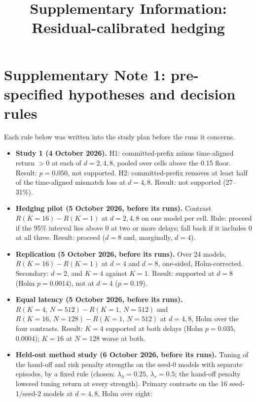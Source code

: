 \documentclass[pdflatex,sn-nature]{sn-jnl}
\begin{document}
\title{Supplementary Information: Residual-calibrated hedging}
\author{ }
\maketitle

\section*{Supplementary Note 1: pre-specified hypotheses and decision rules}
Each rule below was written into the study plan before the runs it concerns.
\begin{itemize}
\item \textbf{Study 1 (4 October 2026).} H1: committed-prefix minus time-aligned return $>0$ at each of $d=2,4,8$, pooled over cells above the 0.15 floor. Result: $p=0.050$, not supported. H2: committed-prefix removes at least half of the time-aligned mismatch loss at $d=4,8$. Result: not supported (27--31\%).
\item \textbf{Hedging pilot (5 October 2026, before its runs).} Contrast $R(K=16)-R(K=1)$ at $d=2,4,8$ on one model per cell. Rule: proceed if the 95\% interval lies above 0 at two or more delays; fall back if it includes 0 at all three. Result: proceed ($d=8$ and, marginally, $d=4$).
\item \textbf{Replication (5 October 2026, before its runs).} Over 24 models, $R(K=16)-R(K=1)$ at $d=4$ and $d=8$, one-sided, Holm-corrected. Secondary: $d=2$, and $K=4$ against $K=1$. Result: supported at $d=8$ (Holm $p=0.0014$), not at $d=4$ ($p=0.19$).
\item \textbf{Equal latency (5 October 2026, before its runs).} $R(K=4,\,N=512)-R(K=1,\,N=512)$ and $R(K=16,\,N=128)-R(K=1,\,N=512)$ at $d=4,8$, Holm over the four contrasts. Result: $K=4$ supported at both delays (Holm $p=0.035$, $0.0004$); $K=16$ at $N=128$ worse at both.
\item \textbf{Held-out method study (6 October 2026, before its runs).} Tuning of the hand-off and risk penalty strengths on the seed-0 models with separate episodes, by a fixed rule (chosen: $\lambda_h=0.25$, $\lambda_r=0.5$; the hand-off penalty lowered tuning return at every strength). Primary contrasts on the 16 seed-1/seed-2 models at $d=4,8$, Holm over eight:
\begin{itemize}

\end{itemize}
\end{itemize}
\end{document}
